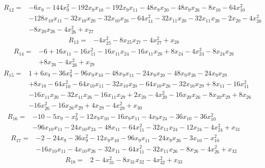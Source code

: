 \[
\begin{aligned}
R_{12}={}&-6x_{9}-144x_{9}^{2}-192x_{9}x_{10}-192x_{9}x_{11}-48x_{9}x_{20}-48x_{9}x_{26}-8x_{10}-64x_{10}^{2}\\
&-128x_{10}x_{11}-32x_{10}x_{20}-32x_{10}x_{26}-64x_{11}^{2}-32x_{11}x_{20}-32x_{11}x_{26}-2x_{20}-4x_{20}^{2}\\
&-8x_{20}x_{26}-4x_{26}^{2}+x_{27}
\end{aligned}
\]
\[
\begin{aligned}
R_{13}={}&-4x_{25}^{2}-8x_{25}x_{27}-4x_{27}^{2}+x_{28}
\end{aligned}
\]
\[
\begin{aligned}
R_{14}={}&-6+16x_{11}-16x_{11}^{2}-16x_{11}x_{24}-16x_{11}x_{26}+8x_{24}-4x_{24}^{2}-8x_{24}x_{26}\\
&+8x_{26}-4x_{26}^{2}+x_{29}
\end{aligned}
\]
\[
\begin{aligned}
R_{15}={}&1+6x_{9}-36x_{9}^{2}-96x_{9}x_{10}-48x_{9}x_{11}-24x_{9}x_{20}-48x_{9}x_{26}-24x_{9}x_{29}\\
&+8x_{10}-64x_{10}^{2}-64x_{10}x_{11}-32x_{10}x_{20}-64x_{10}x_{26}-32x_{10}x_{29}+8x_{11}-16x_{11}^{2}\\
&-16x_{11}x_{20}-32x_{11}x_{26}-16x_{11}x_{29}+2x_{20}-4x_{20}^{2}-16x_{20}x_{26}-8x_{20}x_{29}+8x_{26}\\
&-16x_{26}^{2}-16x_{26}x_{29}+4x_{29}-4x_{29}^{2}+x_{30}
\end{aligned}
\]
\[
\begin{aligned}
R_{16}={}&-10-5x_{9}-x_{9}^{2}-12x_{9}x_{10}-16x_{9}x_{11}-4x_{9}x_{24}-36x_{10}-36x_{10}^{2}\\
&-96x_{10}x_{11}-24x_{10}x_{24}-48x_{11}-64x_{11}^{2}-32x_{11}x_{24}-12x_{24}-4x_{24}^{2}+x_{31}
\end{aligned}
\]
\[
\begin{aligned}
R_{17}={}&-2-24x_{9}-36x_{9}^{2}-12x_{9}x_{10}-96x_{9}x_{11}-24x_{9}x_{26}-3x_{10}-x_{10}^{2}\\
&-16x_{10}x_{11}-4x_{10}x_{26}-32x_{11}-64x_{11}^{2}-32x_{11}x_{26}-8x_{26}-4x_{26}^{2}+x_{32}
\end{aligned}
\]
\[
\begin{aligned}
R_{18}={}&2-4x_{31}^{2}-8x_{31}x_{32}-4x_{32}^{2}+x_{33}
\end{aligned}
\]

